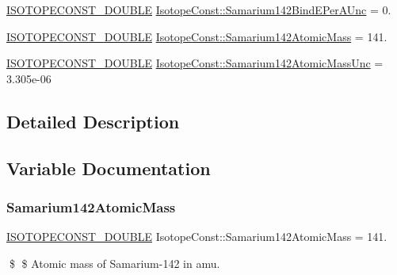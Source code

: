 \begin{DoxyCompactItemize}
\mbox{\hyperlink{group___isotope_const-_macros_ga8f45a7272ce02c0b4c65c44636ed719a}{I\+S\+O\+T\+O\+P\+E\+C\+O\+N\+S\+T\+\_\+\+D\+O\+U\+B\+LE}} \mbox{\hyperlink{group___isotope_const-_samarium-_sm142_ga3d67ec066da0d4513534e310c85f6d3f}{Isotope\+Const\+::\+Samarium142\+Bind\+E\+Per\+A\+Unc}} = 0.
\item 
\mbox{\hyperlink{group___isotope_const-_macros_ga8f45a7272ce02c0b4c65c44636ed719a}{I\+S\+O\+T\+O\+P\+E\+C\+O\+N\+S\+T\+\_\+\+D\+O\+U\+B\+LE}} \mbox{\hyperlink{group___isotope_const-_samarium-_sm142_gabdc594b77b5930a180837a943f68241d}{Isotope\+Const\+::\+Samarium142\+Atomic\+Mass}} = 141.
\item 
\mbox{\hyperlink{group___isotope_const-_macros_ga8f45a7272ce02c0b4c65c44636ed719a}{I\+S\+O\+T\+O\+P\+E\+C\+O\+N\+S\+T\+\_\+\+D\+O\+U\+B\+LE}} \mbox{\hyperlink{group___isotope_const-_samarium-_sm142_gab061c2a78245f7b2fdba40f01262f6be}{Isotope\+Const\+::\+Samarium142\+Atomic\+Mass\+Unc}} = 3.\+305e-\/06
\end{DoxyCompactItemize}


\subsection{Detailed Description}


\subsection{Variable Documentation}
\mbox{\label{group___isotope_const-_samarium-_sm142_gabdc594b77b5930a180837a943f68241d}} 
\subsubsection{\texorpdfstring{Samarium142\+Atomic\+Mass}{Samarium142AtomicMass}}
{\footnotesize\ttfamily \mbox{\hyperlink{group___isotope_const-_macros_ga8f45a7272ce02c0b4c65c44636ed719a}{I\+S\+O\+T\+O\+P\+E\+C\+O\+N\+S\+T\+\_\+\+D\+O\+U\+B\+LE}} Isotope\+Const\+::\+Samarium142\+Atomic\+Mass = 141.}

\$ \$ Atomic mass of Samarium-\/142 in amu. \mbox{\label{group___isotope_const-_samarium-_sm142_gab061c2a78245f7b2fdba40f01262f6be}} 
